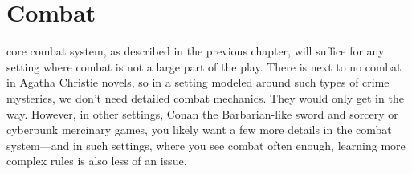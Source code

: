 \chapter{Combat}

 core combat system, as described in the previous chapter, will suffice for any setting where combat is not a large part of the play. There is next to no combat in Agatha Christie novels, so in a setting modeled around such types of crime mysteries, we don't need detailed combat mechanics. They would only get in the way. However, in other settings, Conan the Barbarian-like sword and sorcery or cyberpunk mercinary games, you likely want a few more details in the combat system---and in such settings, where you see combat often enough, learning more complex rules is also less of an issue.
